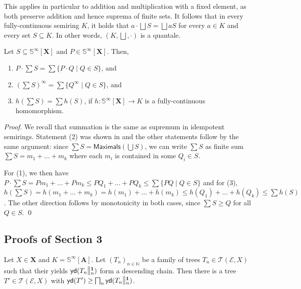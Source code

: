 \documentclass[english,runningheads,a4paper,envcountsame]{llncs}
\newcommand{\Inf}{\bigsqcap}
\newcommand{\Sup}{\bigsqcup}
\newcommand{\Nat}{\mathbb{N}}
\newcommand{\Sinf}{{\mathbb S}^{\infty}}
\newcommand*{\XX}{{\bm X}}
\newcommand*{\EE}{\mathcal{E}}
\newcommand*{\Max}{\mathsf{Maximals}}
\renewcommand{\AA}{{\bm A}}
\newcommand*{\yield}{\mathsf{yd}}
\newcommand*{\Trees}{\mathcal{T}}
\newcommand{\cut}[2]{\scalebox{1}[1.3]{$\|$}\vphantom{|}_{#1}^{#2}}
\newcommand{\one}{\tup 1}
\newcommand*{\co}{\colon}
\newcommand*{\tup}[1]{\mathbf{#1}}
\begin{document}
This applies in particular to addition and multiplication with a fixed element, as both preserve addition and hence suprema of finite sets.
It follows that in every fully-continuous semiring $K$, it holds that $a \cdot \Sup S = \Sup aS$ for every $a \in K$ and every set $S \subseteq K$.
In other words, $(K, \Sup, \cdot)$ is a quantale.


\begingroup
\renewcommand{\thelemma}{\ref{lemSinfExtra}}
\addtocounter{theorem}{-1}
\begin{lemma}
Let $S \subseteq \Sinf[\XX]$ and $P \in \Sinf[\XX]$. Then,
\begin{enumerate}
\item $P \cdot \sum S = \sum \{P \cdot Q \mid Q \in S\}$, and
\item $(\sum S)^\infty = \sum \{Q^\infty \mid Q \in S\}$, and
\item $h(\sum S) = \sum h(S)$, if $h \co \Sinf[\XX] \to K$ is a fully-continuous homomorphism.
\end{enumerate}
\end{lemma}
\endgroup
\begin{proof}
We recall that summation is the same as supremum in idempotent semirings.
Statement (2) was shown in \cite{DannertGraNaaTan19} and the other statements follow by the same argument: since $\sum S = \Max (\bigcup S)$, we can write $\sum S$ as finite sum $\sum S = m_1 + \dots + m_k$ where each $m_i$ is contained in some $Q_i \in S$.

For (1), we then have
$P \cdot \sum S = Pm_1 + \dots + P m_k \le P Q_1 + \dots + P Q_k \le \sum \{ P Q \mid Q \in S \}$
and for (3),
$h(\sum S) = h(m_1 + \dots + m_k) = h(m_1) + \dots + h(m_k) \le h(Q_1) + \dots + h(Q_k) \le \sum h(S)$.
The other direction follows by monotonicity in both cases, since $\sum S \ge Q$ for all $Q \in S$.
\qed
\end{proof}



\subsection{Proofs of Section 3}

\begingroup
\renewcommand{\thelemma}{\ref{lemTreesPuzzle}}
\addtocounter{theorem}{-1}
\begin{lemma}
Let $X \in \XX$ and $K=\Sinf[\AA]$.
Let $(T_n)_{n \in \Nat}$ be a family of trees $T_n \in \Trees(\EE,X)$
such that their yields $\yield(T_n \cut n \one)$ form a descending chain.
Then there is a tree $T' \in \Trees(\EE,X)$ with $\yield(T') \ge \Inf_n \yield(T_n \cut n \one)$.
\end{lemma}
\endgroup
\end{document}
